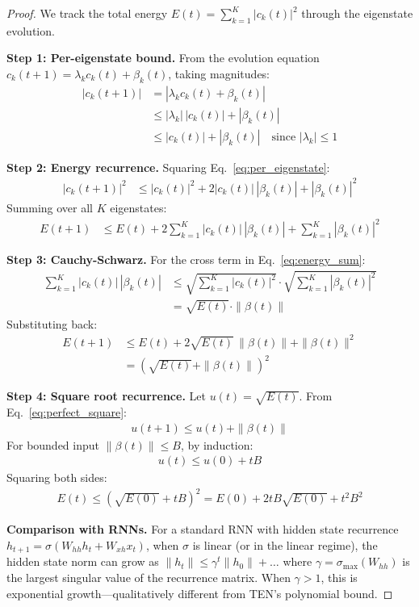 \documentclass{article}
\begin{document}
\begin{proof}
We track the total energy $E(t) = \sum_{k=1}^K |c_k(t)|^2$ through the eigenstate evolution.

\textbf{Step 1: Per-eigenstate bound.}
From the evolution equation $c_k(t+1) = \lambda_k c_k(t) + \beta_k(t)$, taking magnitudes:
\begin{align}
|c_k(t+1)| &= |\lambda_k c_k(t) + \beta_k(t)| \\
&\leq |\lambda_k| \, |c_k(t)| + |\beta_k(t)| \\
&\leq |c_k(t)| + |\beta_k(t)|  \quad \text{since } |\lambda_k| \leq 1 \label{eq:per_eigenstate}
\end{align}

\textbf{Step 2: Energy recurrence.}
Squaring Eq.~\ref{eq:per_eigenstate}:
\begin{align}
|c_k(t+1)|^2 &\leq |c_k(t)|^2 + 2|c_k(t)|\,|\beta_k(t)| + |\beta_k(t)|^2
\end{align}
Summing over all $K$ eigenstates:
\begin{align}
E(t+1) &\leq E(t) + 2\sum_{k=1}^K |c_k(t)|\,|\beta_k(t)| + \sum_{k=1}^K |\beta_k(t)|^2 \label{eq:energy_sum}
\end{align}

\textbf{Step 3: Cauchy-Schwarz.}
For the cross term in Eq.~\ref{eq:energy_sum}:
\begin{align}
\sum_{k=1}^K |c_k(t)|\,|\beta_k(t)| &\leq \sqrt{\sum_{k=1}^K |c_k(t)|^2} \cdot \sqrt{\sum_{k=1}^K |\beta_k(t)|^2} \\
&= \sqrt{E(t)} \cdot \|\beta(t)\|
\end{align}
Substituting back:
\begin{align}
E(t+1) &\leq E(t) + 2\sqrt{E(t)}\,\|\beta(t)\| + \|\beta(t)\|^2 \\
&= \left(\sqrt{E(t)} + \|\beta(t)\|\right)^2 \label{eq:perfect_square}
\end{align}

\textbf{Step 4: Square root recurrence.}
Let $u(t) = \sqrt{E(t)}$. From Eq.~\ref{eq:perfect_square}:
\begin{align}
u(t+1) \leq u(t) + \|\beta(t)\|
\end{align}
For bounded input $\|\beta(t)\| \leq B$, by induction:
\begin{align}
u(t) \leq u(0) + tB
\end{align}
Squaring both sides:
\begin{align}
E(t) \leq \left(\sqrt{E(0)} + tB\right)^2 = E(0) + 2tB\sqrt{E(0)} + t^2 B^2
\end{align}

\textbf{Comparison with RNNs.} For a standard RNN with hidden state recurrence $h_{t+1} = \sigma(W_{hh} h_t + W_{xh} x_t)$, when $\sigma$ is linear (or in the linear regime), the hidden state norm can grow as $\|h_t\| \leq \gamma^t \|h_0\| + \ldots$ where $\gamma = \sigma_{\max}(W_{hh})$ is the largest singular value of the recurrence matrix. When $\gamma > 1$, this is exponential growth---qualitatively different from TEN's polynomial bound.
\end{proof}
\end{document}
